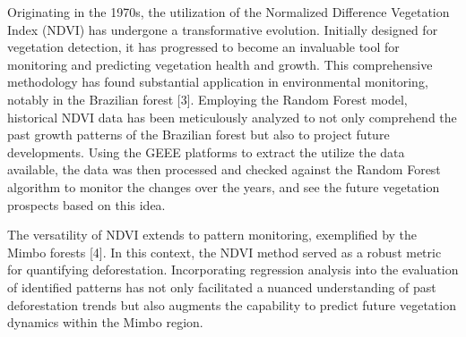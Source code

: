 \documentclass[12pt,a4paper,IEEEtran]{article}
\begin{document}
Originating in the 1970s, the utilization of the Normalized Difference Vegetation Index (NDVI) has undergone a transformative evolution. Initially designed for vegetation detection, it has progressed to become an invaluable tool for monitoring and predicting vegetation health and growth. This comprehensive methodology has found substantial application in environmental monitoring, notably in the Brazilian forest [3]. Employing the Random Forest model, historical NDVI data has been meticulously analyzed to not only comprehend the past growth patterns of the Brazilian forest but also to project future developments. Using the GEEE platforms to extract the utilize the data available, the data was then processed and checked against the Random Forest algorithm to monitor the changes over the years, and see the future vegetation prospects based on this idea.  

The versatility of NDVI extends to pattern monitoring, exemplified by the Mimbo forests [4]. In this context, the NDVI method served as a robust metric for quantifying deforestation. Incorporating regression analysis into the evaluation of identified patterns has not only facilitated a nuanced understanding of past deforestation trends but also augments the capability to predict future vegetation dynamics within the Mimbo region. 

 

\end{document}
